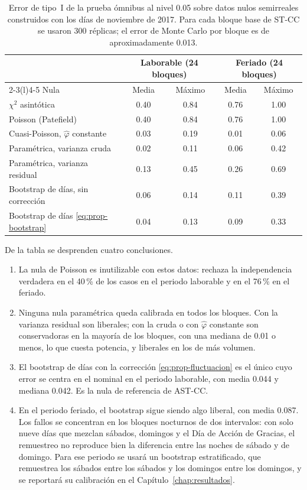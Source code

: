 \begin{table}[t]
\centering
\small
\begin{tabular}{@{}lcccc@{}}
\toprule
 & \multicolumn{2}{c}{Laborable (24 bloques)} & \multicolumn{2}{c}{Feriado (24 bloques)} \\
\cmidrule(lr){2-3}\cmidrule(l){4-5}
Nula & Media & Máximo & Media & Máximo \\
\midrule
$\chi^2$ asintótica & 0.40 & 0.84 & 0.76 & 1.00 \\
Poisson (Patefield) & 0.40 & 0.84 & 0.76 & 1.00 \\
Cuasi-Poisson, $\hat\varphi$ constante & 0.03 & 0.19 & 0.01 & 0.06 \\
Paramétrica, varianza cruda & 0.02 & 0.11 & 0.06 & 0.42 \\
Paramétrica, varianza residual & 0.13 & 0.45 & 0.26 & 0.69 \\
Bootstrap de días, sin corrección & 0.06 & 0.14 & 0.11 & 0.39 \\
Bootstrap de días \eqref{eq:prop-bootstrap} & 0.04 & 0.13 & 0.09 & 0.33 \\
\bottomrule
\end{tabular}
\caption{Error de tipo~I de la prueba ómnibus al nivel 0.05 sobre datos nulos
semirreales construidos con los días de noviembre de 2017. Para cada bloque base
de ST-CC se usaron 300 réplicas; el error de Monte Carlo por bloque es de
aproximadamente 0.013.}
\label{tab:prop-calibracion}
\end{table}

De la tabla se desprenden cuatro conclusiones.

\begin{enumerate}
  \item La nula de Poisson es inutilizable con estos datos: rechaza la
  independencia verdadera en el 40\,\% de los casos en el periodo laborable y
  en el 76\,\% en el feriado.
  \item Ninguna nula paramétrica queda calibrada en todos los bloques. Con la
  varianza residual son liberales; con la cruda o con $\hat\varphi$ constante
  son conservadoras en la mayoría de los bloques, con una mediana de 0.01 o
  menos, lo que cuesta potencia, y liberales en los de más volumen.
  \item El bootstrap de días con la corrección \eqref{eq:prop-fluctuacion} es el
  único cuyo error se centra en el nominal en el periodo laborable, con media
  0.044 y mediana 0.042. Es la nula de referencia de AST-CC.
  \item En el periodo feriado, el bootstrap sigue siendo algo liberal, con media
  0.087. Los fallos se concentran en los bloques nocturnos de dos intervalos:
  con solo nueve días que mezclan sábados, domingos y el Día de Acción de
  Gracias, el remuestreo no reproduce bien la diferencia entre las noches de
  sábado y de domingo. Para ese periodo se usará un bootstrap estratificado, que
  remuestrea los sábados entre los sábados y los domingos entre los domingos, y
  se reportará su calibración en el Capítulo~\ref{chap:resultados}.
\end{enumerate}

